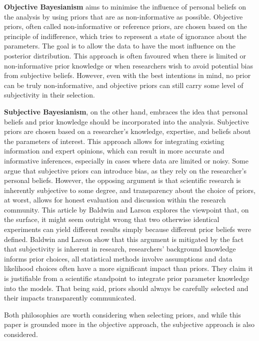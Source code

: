 \textbf{Objective Bayesianism} aims to minimise the influence of personal
beliefs on the analysis by using priors that are as non-informative as
possible. Objective priors, often called non-informative or reference priors,
are chosen based on the principle of indifference, which tries to represent a
state of ignorance about the parameters. The goal is to allow the data to have
the most influence on the posterior distribution. This approach is often
favoured when there is limited or non-informative prior knowledge or when
researchers wish to avoid potential bias from subjective beliefs. However, even
with the best intentions in mind, no prior can be truly non-informative, and
objective priors can still carry some level of subjectivity in their selection.

\textbf{Subjective Bayesianism}, on the other hand, embraces the idea that
personal beliefs and prior knowledge should be incorporated into the analysis.
Subjective priors are chosen based on a researcher's knowledge, expertise, and
beliefs about the parameters of interest. This approach allows for integrating
existing information and expert opinions, which can result in
more accurate and informative inferences, especially in cases where data are
limited or noisy. Some argue that subjective priors can introduce bias, as they
rely on the researcher's personal beliefs. However, the opposing argument is that
scientific research is inherently subjective to some degree, and transparency
about the choice of priors, at worst, allows for honest evaluation and discussion
within the research community.
This article by Baldwin and Larson \cite{clinical} explores the viewpoint
that, on the surface, it might seem outright wrong that two otherwise identical
experiments can yield different results simply because different prior beliefs
were defined. Baldwin and Larson show that this argument is mitigated by the
fact that subjectivity is inherent in research, researchers' background
knowledge informs prior choices, all statistical methods involve assumptions
and data likelihood choices often have a more significant impact than priors. They claim
it is justifiable from a scientific standpoint to integrate prior parameter
knowledge into the models. That being said, priors should always be carefully
selected and their impacts transparently communicated.

Both philosophies are worth considering when selecting priors, and while this
paper is grounded more in the objective approach, the subjective approach is
also considered.

